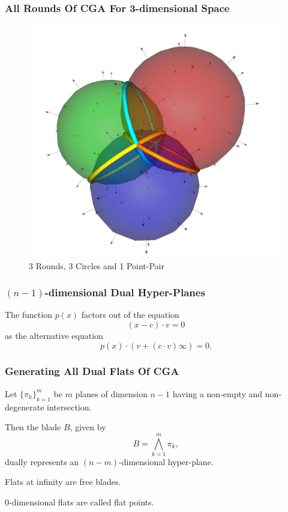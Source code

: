 \documentclass{beamer}
\newcommand{\nvai}{\infty}
\begin{document}
\begin{frame}
\frametitle{All Rounds Of CGA For 3-dimensional Space}
\begin{figure}
\centering
\includegraphics[scale=0.2]{Rounds}
\caption{3 Rounds, 3 Circles and 1 Point-Pair}
\end{figure}
\end{frame}

\begin{frame}
\frametitle{$(n-1)$-dimensional \alert{Dual} Hyper-Planes}
The function $p(x)$ factors out of the equation
\begin{equation*}
(x-c)\cdot v = 0
\end{equation*}
as the alternative equation
\begin{equation*}
p(x)\cdot\left(v+(c\cdot v)\nvai\right) = 0.
\end{equation*}
\end{frame}

\begin{frame}
\frametitle{Generating All \alert{Dual Flats} Of CGA}
Let $\{\pi_k\}_{k=1}^m$ be $m$ planes of dimension $n-1$ having a \alert{non-empty} and
\alert{non-degenerate} intersection.\pause

Then the blade $B$, given by
\begin{equation*}
B = \bigwedge_{k=1}^m\pi_k,
\end{equation*}
\alert{dually} represents an $(n-m)$-dimensional hyper-plane.\pause

\alert{Flats} at infinity are \alert{free blades}.\pause

$0$-dimensional \alert{flats} are called \alert{flat points}.
\end{frame}
\end{document}
